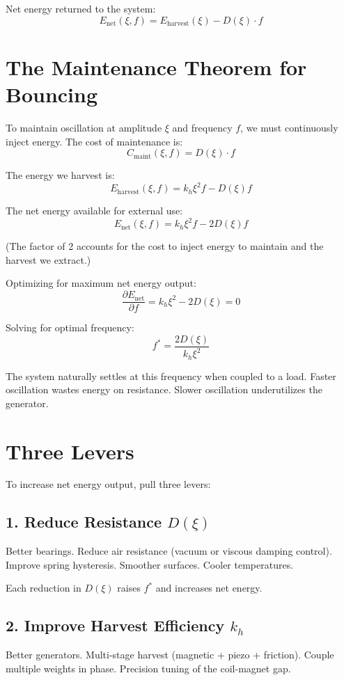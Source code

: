\documentclass[12pt]{article}
\begin{document}
Net energy returned to the system:
\[
E_{\text{net}}(\xi, f) = E_{\text{harvest}}(\xi) - D(\xi) \cdot f
\]

\section{The Maintenance Theorem for Bouncing}

To maintain oscillation at amplitude $\xi$ and frequency $f$, we must continuously inject energy. The cost of maintenance is:
\[
C_{\text{maint}}(\xi, f) = D(\xi) \cdot f
\]

The energy we harvest is:
\[
E_{\text{harvest}}(\xi, f) = k_h \xi^2 f - D(\xi) f
\]

The net energy available for external use:
\[
E_{\text{net}}(\xi, f) = k_h \xi^2 f - 2D(\xi) f
\]

(The factor of 2 accounts for the cost to inject energy to maintain and the harvest we extract.)

Optimizing for maximum net energy output:
\[
\frac{\partial E_{\text{net}}}{\partial f} = k_h \xi^2 - 2D(\xi) = 0
\]

Solving for optimal frequency:
\[
f^* = \frac{2D(\xi)}{k_h \xi^2}
\]

The system naturally settles at this frequency when coupled to a load. Faster oscillation wastes energy on resistance. Slower oscillation underutilizes the generator.

\section{Three Levers}

To increase net energy output, pull three levers:

\subsection{1. Reduce Resistance $D(\xi)$}

Better bearings. Reduce air resistance (vacuum or viscous damping control). Improve spring hysteresis. Smoother surfaces. Cooler temperatures.

Each reduction in $D(\xi)$ raises $f^*$ and increases net energy.

\subsection{2. Improve Harvest Efficiency $k_h$}

Better generators. Multi-stage harvest (magnetic + piezo + friction). Couple multiple weights in phase. Precision tuning of the coil-magnet gap.
\end{document}
